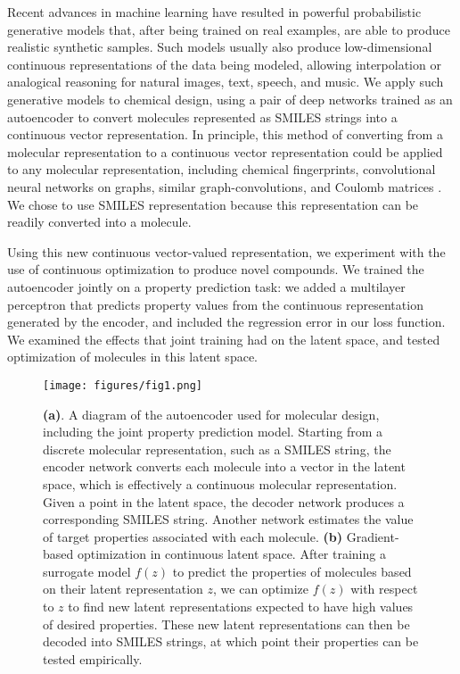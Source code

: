 \documentclass[journal=acscii,manuscript=article]{achemso}
\begin{document}
Recent advances in machine learning have resulted in powerful probabilistic generative models that, after being trained on real examples, are able to produce realistic synthetic samples. %
Such models usually also produce low-dimensional continuous representations of the data being modeled, allowing interpolation or analogical reasoning for 
natural images\cite{radford2015unsupervised}, text\cite{bowman2015generating}, speech, and music\cite{vandenoord_2016,Engel2017NeuralAudio}.
We apply such generative models to chemical design, using a pair of deep networks trained as an autoencoder to convert molecules represented as SMILES strings into a continuous vector representation. In principle, this method of converting from a molecular representation to a continuous vector representation could be applied to any molecular representation, including 
chemical fingerprints,\cite{ECFP2010} 
convolutional neural networks on graphs\cite{duvenaud2015convolutional},
 similar graph-convolutions\cite{kearnes_2016_molecular}, and 
 Coulomb matrices \cite{Rupp_2012}. We chose to use SMILES representation because this representation can be readily converted into a molecule.

Using this new continuous vector-valued representation, we experiment with the use of continuous optimization to produce novel compounds. We trained the autoencoder jointly on a property prediction task: we added a multilayer perceptron that predicts property values from the continuous representation generated by the encoder, and included the regression error in our loss function. We examined the effects that joint training had on the latent space, and tested optimization of molecules in this latent space. 


\begin{figure}[h]
\begin{center}
\texttt{[image: figures/fig1.png]} 
\caption{\small	\textbf{(a)}. A diagram of the autoencoder used for molecular design, including the joint property prediction model.
Starting from a discrete molecular representation, such as a SMILES string, the encoder network converts each molecule into a vector in the latent space, which is effectively a continuous molecular representation. Given a point in the latent space, the decoder network produces a corresponding SMILES string. Another network estimates the value of target properties associated with each molecule.
\textbf{(b)} Gradient-based optimization in continuous latent space.
After training a surrogate model $f(z)$ to predict the properties of molecules based on their latent representation $z$, we can optimize $f(z)$ with respect to $z$ to find new latent representations expected to have high values of desired properties.
These new latent representations can then be decoded into SMILES strings, at which point their properties can be tested empirically.}
\label{fig:ae_opt_diagrams}
\end{center}
\end{figure}
\end{document}
